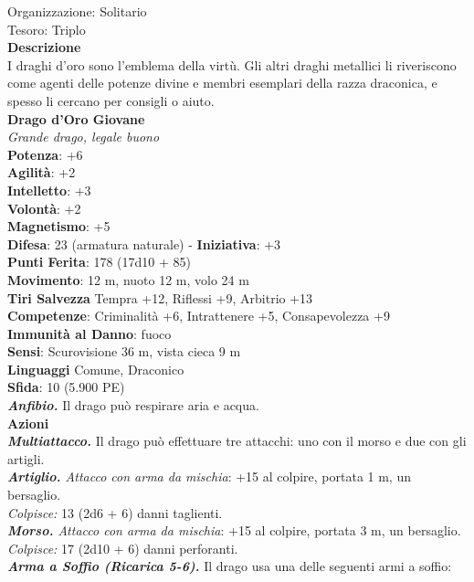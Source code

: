 \begin{multicols}{2}
Organizzazione: Solitario\\
Tesoro: Triplo\\
\textbf{Descrizione}\\
I draghi d'oro sono l'emblema della virtù. Gli altri draghi metallici li riveriscono come agenti delle potenze divine e membri esemplari della razza draconica, e spesso li cercano per consigli o aiuto.\\
\medskip\textbf{Drago d'Oro Giovane}\\
\emph{Grande drago, legale buono}\\
\textbf{Potenza}: +6\\
\textbf{Agilità}: +2\\
\textbf{Intelletto}: +3\\
\textbf{Volontà}: +2\\
\textbf{Magnetismo}: +5\\
\textbf{Difesa}: 23 (armatura naturale) - \textbf{Iniziativa}: +3\\
\textbf{Punti Ferita}: 178 (17d10 + 85)\\
\textbf{Movimento}: 12 m, nuoto 12 m, volo 24 m\\
\textbf{Tiri Salvezza} Tempra +12, Riflessi +9, Arbitrio +13\\
\textbf{Competenze}: Criminalità +6, Intrattenere +5, Consapevolezza +9 \\
\textbf{Immunità al Danno}: fuoco\\
\textbf{Sensi}: Scurovisione 36 m, vista cieca 9 m\\
\textbf{Linguaggi} Comune, Draconico\\
\textbf{Sfida}: 10 (5.900 PE)\smallskip\\
\emph{\textbf{Anfibio.}} Il drago può respirare aria e acqua.\\
\smallskip\textbf{Azioni}\\
\emph{\textbf{Multiattacco.}} Il drago può effettuare tre attacchi: uno con il morso e due con gli artigli.\\
\emph{\textbf{Artiglio.} Attacco con arma da mischia}: +15 al colpire, portata 1 m, un bersaglio.\\
\emph{Colpisce:} 13 (2d6 + 6) danni taglienti.\\
\emph{\textbf{Morso.} Attacco con arma da mischia}: +15 al colpire, portata 3 m, un bersaglio.\\
\emph{Colpisce:} 17 (2d10 + 6) danni perforanti.\\
\emph{\textbf{Arma a Soffio (Ricarica 5-6).}} Il drago usa una delle seguenti armi a soffio:\\

\end{multicols}
